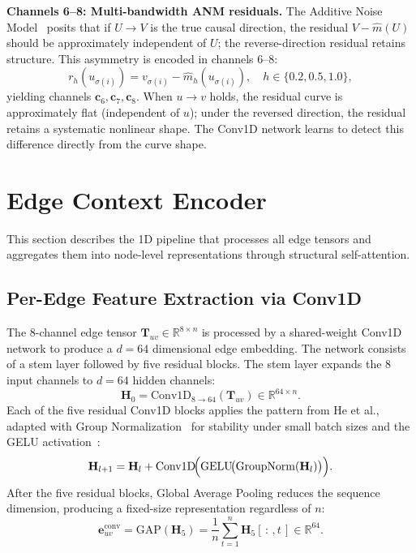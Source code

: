 \textbf{Channels 6--8: Multi-bandwidth ANM residuals.} The Additive Noise Model~\cite{hoyer2009anm} posits that if $U \to V$ is the true causal direction, the residual $V - \hat{m}(U)$ should be approximately independent of $U$; the reverse-direction residual retains structure. This asymmetry is encoded in channels 6--8:
\begin{equation}
r_h\!\left(u_{\sigma(i)}\right) = v_{\sigma(i)} - \hat{m}_h\!\left(u_{\sigma(i)}\right), \quad h \in \{0.2,0.5,1.0\},
\label{eq:anm_resid}
\end{equation}
yielding channels $\mathbf{c}_6, \mathbf{c}_7, \mathbf{c}_8$. When $u \to v$ holds, the residual curve is approximately flat (independent of $u$); under the reversed direction, the residual retains a systematic nonlinear shape. The Conv1D network learns to detect this difference directly from the curve shape.



\section{Edge Context Encoder}
\label{sec:edge_pipeline}

This section describes the 1D pipeline that processes all edge tensors and aggregates them into node-level representations through structural self-attention.

\subsection{Per-Edge Feature Extraction via Conv1D}

The 8-channel edge tensor $\mathbf{T}_{uv} \in \mathbb{R}^{8 \times n}$ is processed by a shared-weight Conv1D network to produce a $d = 64$ dimensional edge embedding. The network consists of a stem layer followed by five residual blocks. The stem layer expands the 8 input channels to $d = 64$ hidden channels:
\begin{equation}
\mathbf{H}_0 = \mathrm{Conv1D}_{8 \to 64}(\mathbf{T}_{uv}) \in \mathbb{R}^{64 \times n}.
\label{eq:stem}
\end{equation}
Each of the five residual Conv1D blocks applies the pattern from He et al.\@\cite{he2016resnet}, adapted with Group Normalization~\cite{wu2018groupnorm} for stability under small batch sizes and the GELU activation~\cite{hendrycks2016gelu}:
\begin{equation}
\mathbf{H}_{l+1} = \mathbf{H}_l + \mathrm{Conv1D}\!\Bigl(\mathrm{GELU}\!\bigl(\mathrm{GroupNorm}(\mathbf{H}_l)\bigr)\Bigr).
\label{eq:resblock}
\end{equation}
After the five residual blocks, Global Average Pooling reduces the sequence dimension, producing a fixed-size representation regardless of $n$:
\begin{equation}
\mathbf{e}_{uv}^{\mathrm{conv}} = \mathrm{GAP}(\mathbf{H}_5) = \frac{1}{n}\sum_{t=1}^{n} \mathbf{H}_5[\,:\,,t\,] \in \mathbb{R}^{64}.
\label{eq:gap}
\end{equation}

